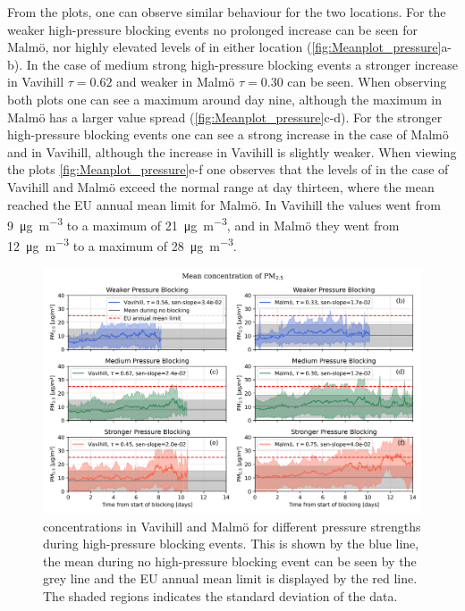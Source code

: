From the plots, one can observe similar behaviour for the two locations. For the weaker high-pressure blocking events no prolonged increase can be seen for Malmö, nor highly elevated levels of \PM in either location (\autoref{fig:Meanplot_pressure}a-b). In the case of medium strong high-pressure blocking events a stronger increase in Vavihill $\tau=0.62$ and weaker in Malmö $\tau=0.30$ can be seen. When observing both plots one can see a maximum around day nine, although the maximum in Malmö has a larger value spread (\autoref{fig:Meanplot_pressure}c-d). For the stronger high-pressure blocking events one can see a strong increase in the case of Malmö and in Vavihill, although the increase in Vavihill is slightly weaker. When viewing the plots \autoref{fig:Meanplot_pressure}e-f one observes that the levels of \PM in the case of Vavihill and Malmö exceed the normal range at day thirteen, where the mean reached the EU annual mean limit for Malmö. In Vavihill the values went from \SI{9}{\micro\gram\per\meter\cubed} to a maximum of \SI{21}{\micro\gram\per\meter\cubed}, and in Malmö they went from \SI{12}{\micro\gram\per\meter\cubed} to a maximum of \SI{28}{\micro\gram\per\meter\cubed}. 


\begin{figure}[H]
        \centering
        \includegraphics[width=\textwidth]{Figures/Meanplot_pressure.png}
        \caption{\PM concentrations in Vavihill and Malmö for different pressure strengths during high-pressure blocking events. This is shown by the blue line, the mean during no high-pressure blocking event can be seen by the grey line and the EU annual mean limit is displayed by the red line. The shaded regions indicates the standard deviation of the data.}
        \label{fig:Meanplot_pressure}
\end{figure}
 

